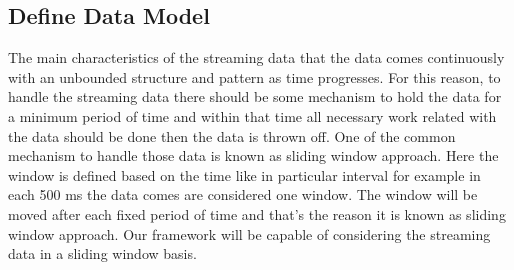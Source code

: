 \subsection{Define Data Model}
The main characteristics of the streaming data that the data comes continuously with an unbounded structure and pattern as time progresses. For this reason, to handle the streaming data there should be some mechanism to hold the data for a minimum period of time and within that time all necessary work related with the data should be done then the data is thrown off. One of the common mechanism to handle those data is known as sliding window approach. Here the window is defined based on the time like in particular interval for example in each 500 ms the data comes are considered one window. The window will be moved after each fixed period of time and that's the reason it is known as sliding window approach. Our framework will be capable of considering the streaming data in a sliding window basis.
